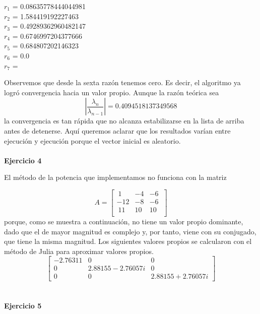 \documentclass[11pt]{article}
\begin{document}
\begin{multicols}{3}
\noindent
$ r_{1} $ = 0.08635778444044981 \\
$ r_{2} $ = 1.584419192227463 \\
$ r_{3} $ = 0.49289362960482147 \\
$ r_{4} $ = 0.6746997204377666 \\
$ r_{5} $ =  0.684807202146323 \\
$ r_{6} $ = 0.0 \\
$ r_{7} $ =  \\
\end{multicols}

Observemos que desde la sexta razón tenemos cero. Es decir, el algoritmo
ya logró convergencia hacia un valor propio. Aunque la razón teórica sea $$
\left| \frac{\lambda_n}{\lambda_{n-1}} \right| = 0.4094518137349568
$$ la convergencia es tan rápida que no alcanza estabilizarse en la lista de
arriba antes de detenerse.
Aquí queremos aclarar que los resultados varían entre ejecución y ejecución
porque el vector inicial es aleatorio.
\\
\\
\noindent
\textbf{Ejercicio 4}

\noindent
El método de la potencia que implementamos no funciona con la matriz

$$
A =
\begin{bmatrix}
 \ 1 & -4 & -6 \ \\
-12 & -8 & -6 \ \\
 \ 11 & 10 & 10 \ \\
\end{bmatrix}
$$
porque, como se muestra a continuación, no tiene un valor propio dominante, dado que el de mayor magnitud es complejo y, por tanto, viene con su conjugado, que tiene la misma magnitud. Los siguientes valores propios se calcularon con el método de Julia para aproximar valores propios.
$$
\begin{bmatrix}
 -2.76311 & 0 & 0 \\
 0 & 2.88155-2.76057i & 0 \\
 0 & 0 & 2.88155+2.76057i
\end{bmatrix}
$$
\\
\\

\noindent
\textbf{Ejercicio 5}
\end{document}
